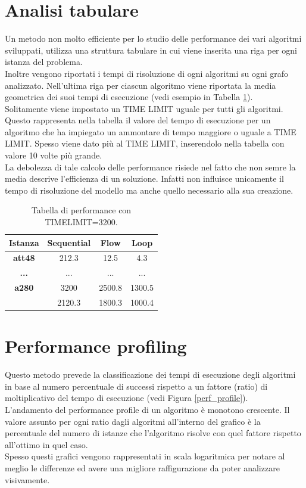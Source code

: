 \section{Analisi tabulare}
Un metodo non molto efficiente per lo studio delle performance dei vari algoritmi sviluppati, utilizza una struttura tabulare in cui viene inserita una riga per ogni istanza del problema.\\ Inoltre vengono riportati i tempi di risoluzione di ogni algoritmi su ogni grafo analizzato. Nell'ultima riga per ciascun algoritmo viene riportata la media geometrica dei suoi tempi di esecuzione (vedi esempio in Tabella \ref{result_table}).\\
Solitamente viene impostato un TIME LIMIT uguale per tutti gli algoritmi. Questo rappresenta nella tabella il valore del tempo di esecuzione per un algoritmo che ha impiegato un ammontare di tempo maggiore o uguale a TIME LIMIT.
Spesso viene dato più al TIME LIMIT, inserendolo nella tabella con valore 10 volte più grande.\\ La debolezza di tale calcolo delle performance risiede nel fatto che non semre la media descrive  l'efficienza di un soluzione. Infatti non influisce unicamente il tempo di risoluzione del modello ma anche quello necessario alla sua creazione. 

\begin{table}[h]
\centering
\begin{tabular}{|c|c|c|c|}
\multicolumn{1}{c}{\textbf{Istanza}} & \multicolumn{1}{c}{\textbf{Sequential}} & \multicolumn{1}{c}{\textbf{Flow}} &
\multicolumn{1}{c}{\textbf{Loop}}\\
\hline
\textbf{att48} & {212.3} & {12.5} & {4.3}\\
\hline
{\textbf{...}} & {...} & {...} & {...}\\
\hline
\textbf{a280} & {3200} & {2500.8} & {1300.5}\\
\hline
\hline
\multicolumn{1}{c}{} & \multicolumn{1}{c}{2120.3} & \multicolumn{1}{c}{1800.3}& \multicolumn{1}{c}{1000.4}\\
\end{tabular}
\caption{\footnotesize{Tabella di performance con TIMELIMIT=3200.}}\label{result_table}
\end{table}

\section{Performance profiling}
Questo metodo prevede la classificazione dei tempi di esecuzione degli algoritmi in base al numero percentuale di successi rispetto a un fattore (ratio) di moltiplicativo del tempo di esecuzione (vedi Figura \ref{perf_profile}).\\
L'andamento del performance profile di un algoritmo è monotono crescente. Il valore assunto per ogni ratio dagli algoritmi all'interno del grafico è la percentuale del numero di istanze che l'algoritmo risolve con quel fattore rispetto all'ottimo in quel caso.\\
Spesso questi grafici vengono rappresentati in scala logaritmica per notare al meglio le differenze ed avere una migliore raffigurazione da poter analizzare visivamente.

